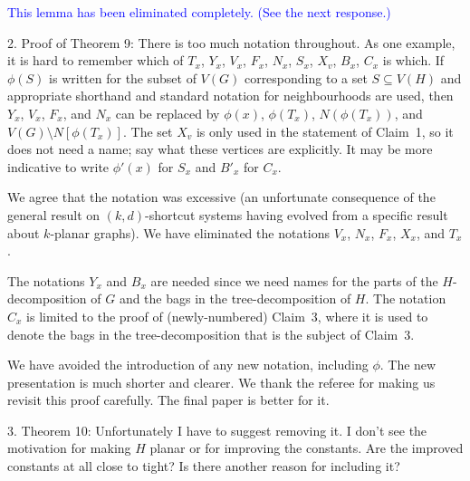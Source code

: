 \documentclass[12pt]{article}
\newenvironment{response}{\color{blue}}{}
\begin{document}
\textcolor{blue}{This lemma has been eliminated completely. (See the next response.)}

2. Proof of Theorem 9: There is too much notation throughout. As
one example, it is hard to remember which of $T_x$, $Y_x$, $V_x$, $F_x$, $N_x$,
$S_x$, $X_v$, $B_x$, $C_x$ is which. If $\phi(S)$ is written for the subset of $V(G)$
corresponding to a set $S \subseteq V(H)$ and appropriate shorthand and
standard notation for neighbourhoods are used, then $Y_x$, $V_x$, $F_x$, and
$N_x$ can be replaced by $\phi(x)$, $\phi(T_x)$, $N(\phi(T_x))$, and $V(G) \setminus N[\phi(T_x)]$.
The set $X_v$ is only used in the statement of Claim~1, so it does not
need a name; say what these vertices are explicitly. It may be more
indicative to write $\phi'(x)$ for $S_x$ and $B'_x$ for $C_x$.

\begin{response}
  We agree that the notation was excessive (an unfortunate consequence of the general result on $(k,d)$-shortcut systems having evolved from a specific result about $k$-planar graphs).  We have eliminated the notations $V_x$, $N_x$, $F_x$, $X_x$, and $T_x$.

  The notations $Y_x$ and $B_x$ are needed since we need names for the parts of the $H$-decomposition of $G$ and the bags in the tree-decomposition of $H$.    The notation $C_x$ is limited to the proof of (newly-numbered) Claim~3, where it is used to denote the bags in the tree-decomposition that is the subject of Claim~3.

  We have avoided the introduction of any new notation, including $\phi$.  The new presentation is much shorter and clearer.  We thank the referee for making us revisit this proof carefully.  The final paper is better for it.
\end{response}

3. Theorem 10: Unfortunately I have to suggest removing it. I don’t see
the motivation for making $H$ planar or for improving the constants.
Are the improved constants at all close to tight? Is there another
reason for including it?
\end{document}
